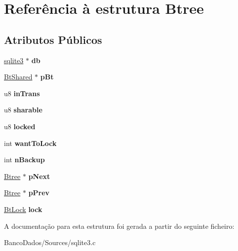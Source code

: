 \hypertarget{struct_btree}{\section{Referência à estrutura Btree}
\label{struct_btree}
}
\subsection*{Atributos Públicos}
\begin{DoxyCompactItemize}
\item 
\hypertarget{struct_btree_a2b3cfec48b6e9fcfd641d433816ae5c3}{\hyperlink{structsqlite3}{sqlite3} $\ast$ {\bfseries db}}\label{struct_btree_a2b3cfec48b6e9fcfd641d433816ae5c3}

\item 
\hypertarget{struct_btree_a63bab5d744d48d14368af048dddf2f20}{\hyperlink{struct_bt_shared}{Bt\-Shared} $\ast$ {\bfseries p\-Bt}}\label{struct_btree_a63bab5d744d48d14368af048dddf2f20}

\item 
\hypertarget{struct_btree_a50007448960c05dfd1fdc7db3e277685}{u8 {\bfseries in\-Trans}}\label{struct_btree_a50007448960c05dfd1fdc7db3e277685}

\item 
\hypertarget{struct_btree_a114f157127c76a1fbad8292e4b39c4dd}{u8 {\bfseries sharable}}\label{struct_btree_a114f157127c76a1fbad8292e4b39c4dd}

\item 
\hypertarget{struct_btree_a16fc8292bae9a66cfec03f6cb82d06a8}{u8 {\bfseries locked}}\label{struct_btree_a16fc8292bae9a66cfec03f6cb82d06a8}

\item 
\hypertarget{struct_btree_a97368ea300f0b74b8e80ea07da0cea2a}{int {\bfseries want\-To\-Lock}}\label{struct_btree_a97368ea300f0b74b8e80ea07da0cea2a}

\item 
\hypertarget{struct_btree_a7a3e7cf38bc9c3021a9e270a54ecfb1e}{int {\bfseries n\-Backup}}\label{struct_btree_a7a3e7cf38bc9c3021a9e270a54ecfb1e}

\item 
\hypertarget{struct_btree_a9e6d2ca44c10ed8ef0be004225a74ef5}{\hyperlink{struct_btree}{Btree} $\ast$ {\bfseries p\-Next}}\label{struct_btree_a9e6d2ca44c10ed8ef0be004225a74ef5}

\item 
\hypertarget{struct_btree_a0423f1c55c1fe6812161a49bb2bf604f}{\hyperlink{struct_btree}{Btree} $\ast$ {\bfseries p\-Prev}}\label{struct_btree_a0423f1c55c1fe6812161a49bb2bf604f}

\item 
\hypertarget{struct_btree_a943ed8799c9943f753a88cf44f1632dc}{\hyperlink{struct_bt_lock}{Bt\-Lock} {\bfseries lock}}\label{struct_btree_a943ed8799c9943f753a88cf44f1632dc}

\end{DoxyCompactItemize}


A documentação para esta estrutura foi gerada a partir do seguinte ficheiro\-:\begin{DoxyCompactItemize}
\item 
Banco\-Dados/\-Sources/sqlite3.\-c\end{DoxyCompactItemize}

